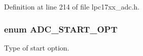 \-Definition at line 214 of file lpc17xx\-\_\-adc.\-h.

\hypertarget{group___a_d_c___public___types_gac6226b9af610bd4800b65ddfc93ee516}{
\subsubsection[{\-A\-D\-C\-\_\-\-S\-T\-A\-R\-T\-\_\-\-O\-P\-T}]{\setlength{\rightskip}{0pt plus 5cm}enum {\bf \-A\-D\-C\-\_\-\-S\-T\-A\-R\-T\-\_\-\-O\-P\-T}}}\label{group___a_d_c___public___types_gac6226b9af610bd4800b65ddfc93ee516}


\-Type of start option. 

